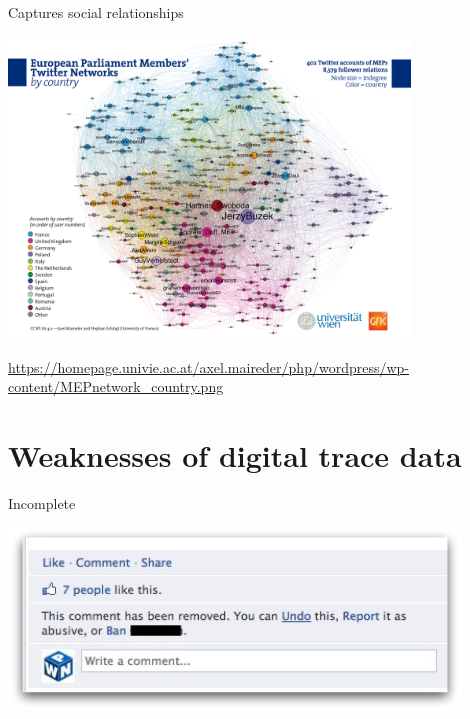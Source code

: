 \documentclass{beamer}
\def\vf{\vfill}
\begin{document}
\begin{frame}{Captures social relationships}

\begin{center}
	\includegraphics[width=0.8\textwidth]{figures/european_networks.png}
\end{center}

\vf
\tiny{\url{https://homepage.univie.ac.at/axel.maireder/php/wordpress/wp-content/MEPnetwork_country.png}}

\end{frame}

\section{Weaknesses of digital trace data}

\begin{frame}{Incomplete}

\begin{center}
	\includegraphics[width=0.9\textwidth]{figures/nocomment.jpg}
\end{center}

\end{frame}
\end{document}
